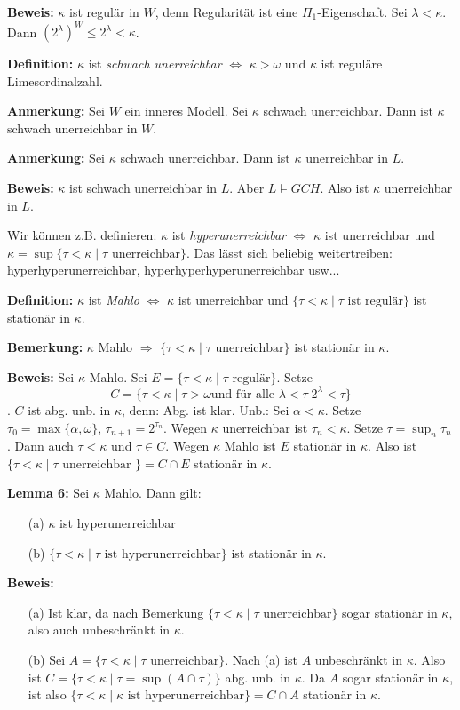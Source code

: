 \documentclass[a4paper,fontsize=11pt]{scrartcl}
\begin{document}
{\bf Beweis:} $\kappa$ ist regulär in $W$, denn Regularität ist eine
$\Pi_1$-Eigenschaft. Sei $\lambda<\kappa$. Dann $(2^{\lambda})^W\le
2^{\lambda}<\kappa$.

{\bf Definition:} $\kappa$ ist \emph{schwach unerreichbar} $\iff$
$\kappa>\omega$ und $\kappa$ ist reguläre Limesordinalzahl.

{\bf Anmerkung:} Sei $W$ ein inneres Modell. Sei $\kappa$ schwach
unerreichbar. Dann ist $\kappa$ schwach unerreichbar in $W$.

{\bf Anmerkung:} Sei $\kappa$ schwach unerreichbar. Dann ist $\kappa$ unerreichbar in $L$.

{\bf Beweis:} $\kappa$ ist schwach unerreichbar in $L$. Aber $L\models
GCH$. Also ist $\kappa$ unerreichbar in $L$.

Wir können z.B. definieren: $\kappa$ ist \emph{hyperunerreichbar}
$\iff$ $\kappa$ ist unerreichbar und $\kappa
=\sup\{\tau<\kappa\mid\tau \mbox{ unerreichbar}\}$. Das lässt sich
beliebig weitertreiben: hyperhyperunerreichbar,
hyperhyperhyperunerreichbar usw...

{\bf Definition:} $\kappa$ ist \emph{Mahlo} $\iff$ $\kappa$ ist
unerreichbar und $\{\tau<\kappa\mid \tau \mbox{ ist regulär}\}$ ist
stationär in $\kappa$.

{\bf Bemerkung:} $\kappa$ Mahlo $\Rightarrow$ $\{ \tau<\kappa\mid \tau\mbox{ unerreichbar}\}$ ist stationär in $\kappa$.

{\bf Beweis:} Sei $\kappa$ Mahlo. Sei $E= \{\tau<\kappa\mid \tau
\mbox{ regulär} \}$. Setze \[C=\{ \tau<\kappa\mid \tau>\omega \mbox{
  und für alle }\lambda<\tau\; 2^{\lambda}<\tau\}\]. $C$ ist
abg. unb. in $\kappa$, denn: Abg. ist klar.  Unb.: Sei
$\alpha<\kappa$.  Setze $\tau_0=\max\{\alpha,\omega\}$,
$\tau_{n+1}=2^{\tau_n}$.  Wegen $\kappa$ unerreichbar ist
$\tau_n<\kappa$.  Setze $\tau=\sup_n\tau_n$.  Dann auch $\tau<\kappa$
und $\tau\in C$.  Wegen $\kappa$ Mahlo ist $E$ stationär in $\kappa$.
Also ist $\{\tau<\kappa\mid \tau\mbox{ unerreichbar }\} = C\cap E$
stationär in $\kappa$.

{\bf Lemma 6:} Sei $\kappa$ Mahlo. Dann gilt: 
\begin{itemize}
\item[(a)] $\kappa$ ist hyperunerreichbar
\item[(b)] $\{\tau<\kappa\mid \tau \mbox{ ist hyperunerreichbar}\}$ ist stationär in $\kappa$.
\end{itemize}

{\bf Beweis:}
\begin{itemize}
\item[(a)] Ist klar, da nach Bemerkung $\{\tau<\kappa\mid \tau\mbox{ unerreichbar}\}$  sogar stationär in $\kappa$, also auch unbeschränkt in $\kappa$.
\item[(b)] Sei $A=\{\tau<\kappa\mid \tau \mbox{ unerreichbar}\}$. Nach
  (a) ist $A$ unbeschränkt in $\kappa$. Also ist $C=\{ \tau<\kappa\mid
  \tau=\sup(A\cap\tau)\}$ abg. unb. in $\kappa$. Da $A$ sogar
  stationär in $\kappa$, ist also $\{\tau<\kappa\mid \kappa \mbox{ ist
    hyperunerreichbar}\}=C\cap A$ stationär in $\kappa$.
\end{itemize}
\end{document}
